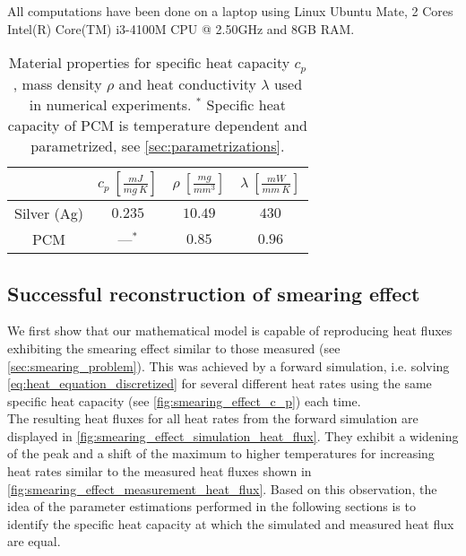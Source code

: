 \documentclass{scrartcl}[12pt, halfparskip]
\numberwithin{equation}{section}
\numberwithin{figure}{section}
\numberwithin{table}{section}
\begin{document}

All computations have been done on a laptop using Linux Ubuntu Mate, 2 Cores Intel(R) Core(TM) i3-4100M CPU @ 2.50GHz and 8GB RAM. 


\begin{table}[H]
	\centering
	\caption{Material properties for specific heat capacity $c_p$, mass density $\rho$ and heat conductivity $\lambda$ used in numerical experiments. $^*$ Specific heat capacity of PCM is temperature dependent and parametrized, see \cref{sec:parametrizations}. \vspace{0.1cm}}

	\begin{tabular}{| c | c | c | c |} \hline
		& $c_p \ [\frac{mJ}{mg \ K}]$ & $\rho \ [\frac{mg}{mm^3}]$ & $\lambda \ [\frac{mW}{mm \ K}]$ \\ \hline
		Silver (Ag) & $0.235$ & $10.49$ & $430$ \\
		PCM & ---$^*$ & $0.85$ & $0.96$ \\ \hline
	\end{tabular}
	\label{tab:const_material_properties}
\end{table}

\subsection{Successful reconstruction of smearing effect}
We first show that our mathematical model is capable of reproducing heat fluxes exhibiting the smearing effect similar to those measured (see \cref{sec:smearing_problem}). This was achieved by a forward simulation, i.e. solving \cref{eq:heat_equation_discretized} for several different heat rates using the same specific heat capacity (see \cref{fig:smearing_effect_c_p}) each time. \\
The resulting heat fluxes for all heat rates from the forward simulation are displayed in \cref{fig:smearing_effect_simulation_heat_flux}. They exhibit a widening of the peak and a shift of the maximum to higher temperatures for increasing heat rates similar to the measured heat fluxes shown in \cref{fig:smearing_effect_measurement_heat_flux}. 
Based on this observation, the idea of the parameter estimations performed in the following sections is to identify the specific heat capacity at which the simulated and measured heat flux are equal.
\end{document}
